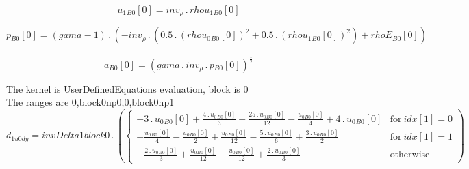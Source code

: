 \documentclass{article}
\begin{document}
\begin{dmath}{u_{1}{_{B0}}}[{0}] = inv_{\rho} \,.\, {rhou_{1}{_{B0}}}[{0}]\end{dmath}

\begin{dmath}{p{_{B0}}}[{0}] = \left(gama - 1\right) \,.\, \left(- inv_{\rho} \,.\, \left(0.5 \,.\, \left({rhou_{0}{_{B0}}}[{0}] \right)^{2} + 0.5 \,.\, \left({rhou_{1}{_{B0}}}[{0}] \right)^{2}\right) + {rhoE{_{B0}}}[{0}]\right)\end{dmath}

\begin{dmath}{a{_{B0}}}[{0}] = \left(gama \,.\, inv_{\rho} \,.\, {p{_{B0}}}[{0}] \right)^{\frac{1}{2}}\end{dmath}

\noindent The kernel is UserDefinedEquations evaluation, block is 0\\\noindent The ranges are 0,block0np0,0,block0np1\\\begin{dmath}d_{1 u0 dy} = invDelta1block0 \,.\, \left(\begin{cases} - 3 \,.\, {u_{0}{_{B0}}}[{0}] + \frac{4 \,.\, {u_{0}{_{B0}}}[{0}]}{3} - \frac{25 \,.\, {u_{0}{_{B0}}}[{0}]}{12} - \frac{{u_{0}{_{B0}}}[{0}]}{4} + 4 \,.\, {u_{0}{_{B0}}}[{0}] & 
\text{for}\: {idx}[{1}] = 0 \\- \frac{{u_{0}{_{B0}}}[{0}]}{4} - \frac{{u_{0}{_{B0}}}[{0}]}{2} + \frac{{u_{0}{_{B0}}}[{0}]}{12} - \frac{5 \,.\, {u_{0}{_{B0}}}[{0}]}{6} + \frac{3 \,.\, {u_{0}{_{B0}}}[{0}]}{2} & \text{for}\: {idx}[{1}] = 1 \\- \frac{2 
\,.\, {u_{0}{_{B0}}}[{0}]}{3} + \frac{{u_{0}{_{B0}}}[{0}]}{12} - \frac{{u_{0}{_{B0}}}[{0}]}{12} + \frac{2 \,.\, {u_{0}{_{B0}}}[{0}]}{3} & \text{otherwise} \end{cases}\right)\end{dmath}
\end{document}

